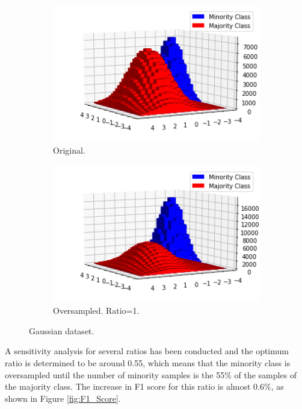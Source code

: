 \documentclass[conference]{IEEEtran}
\begin{document}
	
		\begin{figure}[h]
		\centering
		\begin{subfigure}[h]{0.24\textwidth}
			\centering
			\includegraphics[width=\textwidth]{Oversampling_2D_OriginalDataset}
			\caption{Original.}
			\label{fig:Oversampling_2D_OriginalDataset}
		\end{subfigure}
		\hfill
		\begin{subfigure}[h]{0.24\textwidth}
			\centering
			\includegraphics[width=\textwidth]{Oversampling_2D_OversampledDataset}
			\caption{Oversampled. Ratio=1.}
			\label{fig:Oversampling_2D_OversampledDataset}
		\end{subfigure}
		\caption{Gaussian dataset.}
		\label{fig:Oversampling_2D_OriginalHistograms}
	\end{figure}
	
	A sensitivity analysis for several ratios has been conducted and the optimum ratio is determined to be around 0.55, which means that the minority class is oversampled until the number of minority samples is the 55\% of the samples of the majority class. The increase in F1 score for this ratio is almost 0.6\%, as shown in Figure \ref{fig:F1_Score}.
\end{document}
